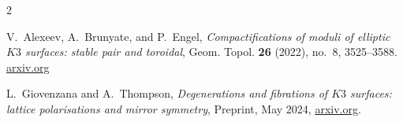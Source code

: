 \documentclass[11pt]{amsart}
\theoremstyle{plain}
\theoremstyle{remark}
\begin{document}
\begin{thebibliography}{2}

V.~Alexeev, A.~Brunyate, and P.~Engel,
\emph{Compactifications of moduli of elliptic \(K3\) surfaces: stable pair and
toroidal},
Geom. Topol. \textbf{26} (2022), no.~8, 3525--3588.
\href{https://arxiv.org/abs/2104.03943}{arxiv.org}

L.~Giovenzana and A.~Thompson,
\emph{Degenerations and fibrations of \(K3\) surfaces: lattice polarisations and
mirror symmetry},
Preprint, May 2024,
\href{https://arxiv.org/abs/2405.12009}{arxiv.org}.

\end{thebibliography}
\end{document}
